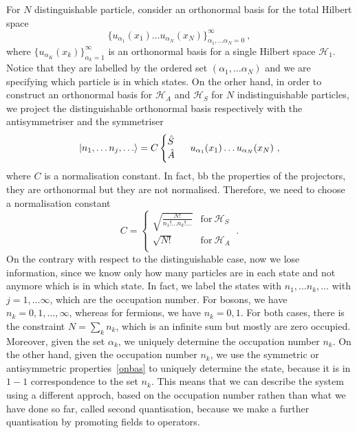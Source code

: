     For $N$ distinguishable particle, consider an orthonormal basis for the total Hilbert space
    \begin{equation*}
        \{u_{\alpha_1}(x_1) \ldots u_{\alpha_N}(x_N)\}_{\alpha_1, \ldots \alpha_N=0}^\infty ~,
    \end{equation*}
    where $\{u_{\alpha_K} (x_k)\}_{\alpha_k = 1}^\infty$ is an orthonormal basis for a single Hilbert space $\mathcal H_1$. Notice that they are labelled by the ordered set $(\alpha_1, \ldots \alpha_N)$ and we are specifying which particle is in which states. 
    On the orher hand, in order to construct an orthonormal basis for $\mathcal H_A$ and $\mathcal H_S$ for $N$ indistinguishable particles, we project the distinguishable orthonormal basis respectively with the antisymmetriser and the symmetriser
    \begin{equation}\label{onbas}
        \vert n_1, \ldots n_j, \ldots\rangle = C \begin{cases} \hat S \\ \hat A \end{cases} ~ u_{\alpha_1}(x_1) \ldots u_{\alpha_N}(x_N) ~,
    \end{equation}
    where $C$ is a normalisation constant. In fact, bb the properties of the projectors, they are orthonormal but they are not normalised. Therefore, we need to choose a normalisation constant
    \begin{equation*}
        C = \begin{cases}
            \sqrt{\frac{N!}{n_1! \ldots n_k! \ldots}} & \text{for}~ \mathcal H_S \\
            \sqrt{N!} & \text{for}~ \mathcal H_A \\
        \end{cases} ~.
    \end{equation*}
    On the contrary with respect to the distinguishable case, now we lose information, since we know only how many particles are in each state and not anymore which is in which state. In fact, we label the states with $n_1, \ldots n_k, \dots$ with $j=1, \ldots \infty$, which are the occupation number. For bosons, we have $n_k = 0, 1, \ldots, \infty$, whereas for fermions, we have $n_k = 0, 1$. For both cases, there is the constraint $N = \sum_k n_k$, which is an infinite sum but mostly are zero occupied. Moreover, given the set $\alpha_k$, we uniquely determine the occupation number $n_k$. On the other hand, given the occupation number $n_k$, we use the symmetric or antisymmetric properties~\eqref{onbas} to uniquely determine the state, because it is in $1-1$ correspondence to the set $n_k$. This means that we can describe the system using a different approch, based on the occupation number rathen than what we have done so far, called second quantisation, because we make a further quantisation by promoting fields to operators.

